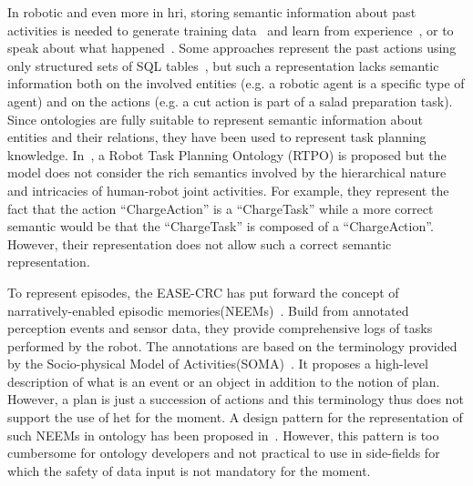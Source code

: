 In robotic and even more in \acrshort{hri}, storing semantic information about past activities is needed to generate training data~\cite{diab_2020_knowing} and learn from experience~\cite{petit_2016_reasoning}, or to speak about what happened~\cite{mealier_2017_narrative}. Some approaches represent the past actions using only structured sets of SQL tables~\cite{mealier_2017_narrative}, but such a representation lacks semantic information both on the involved entities (e.g. a robotic agent is a specific type of agent) and on the actions (e.g. a cut action is part of a salad preparation task). Since ontologies are fully suitable to represent semantic information about entities and their relations, they have been used to represent task planning knowledge. In~\cite{sun_2019_rtpo}, a Robot Task Planning Ontology (RTPO) is proposed but the model does not consider the rich semantics involved by the hierarchical nature and intricacies of human-robot joint activities. For example, they represent the fact that the action ``ChargeAction'' is a ``ChargeTask'' while a more correct semantic would be that the ``ChargeTask'' is composed of a ``ChargeAction''. However, their representation does not allow such a correct semantic representation.

To represent episodes, the EASE-CRC has put forward the concept of narratively-enabled episodic memories(NEEMs)~\cite{diab_2020_knowing}. Build from annotated perception events and sensor data, they provide comprehensive logs of tasks performed by the robot. The annotations are based on the terminology provided by the Socio-physical Model of Activities(SOMA)~\cite{bessler_2020_foundations}. It proposes a high-level description of what is an event or an object in addition to the notion of plan. However, a plan is just a succession of actions and this terminology thus does not support the use of \acrshort{het} for the moment. A design pattern for the representation of such NEEMs in ontology has been proposed in~\cite{bernd_2020_modelling}. However, this pattern is too cumbersome for ontology developers and not practical to use in side-fields for which the safety of data input is not mandatory for the moment.

